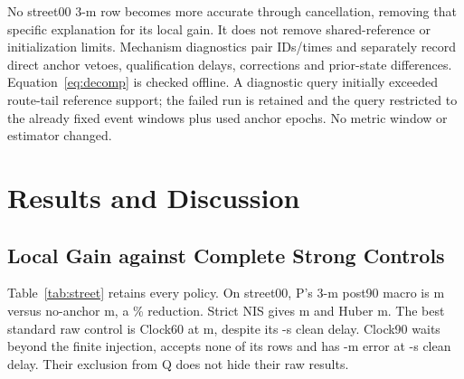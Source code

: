 \documentclass[conference]{IEEEtran}
\begin{document}
No street00 3-m row becomes more accurate through cancellation, removing that specific explanation for its local gain. It does not remove shared-reference or initialization limits. Mechanism diagnostics pair IDs/times and separately record direct anchor vetoes, qualification delays, corrections and prior-state differences. Equation~\eqref{eq:decomp} is checked offline. A diagnostic query initially exceeded route-tail reference support; the failed run is retained and the query restricted to the already fixed event windows plus used anchor epochs. No metric window or estimator changed.

\begin{table}[t]
\caption{Six routes, all already seen in this post-hoc analysis. 3-m post90 event-macro errors (m); P natural RMSE / inherited cap (m); maximum actual clean delay $T_c$ (s). Lower raw controls remain visible even outside Q.}\label{tab:routes}
\centering\small\setlength{\tabcolsep}{5pt}

\end{table}

\section{Results and Discussion}
\subsection{Local Gain against Complete Strong Controls}
Table~\ref{tab:street} retains every policy. On street00, P's 3-m post90 macro is  m versus no-anchor  m, a \% reduction. Strict NIS gives  m and Huber  m. The best standard raw control is Clock60 at  m, despite its -s clean delay. Clock90 waits beyond the finite injection, accepts none of its rows and has -m error at -s clean delay. Their exclusion from Q does not hide their raw results.

\begin{table}[t]
\caption{street00 controlled 3-m results, all 19 fixed policies. $R_{90}/R_{180}$: event-macro horizontal RMSE (m). $T_c$: maximum actual clean admission (s); C180 is censored. $n_b$: accepted injected rows out of 270. Q combines natural cost, clean service and coverage.}\label{tab:street}
\centering\small\setlength{\tabcolsep}{3pt}

\end{table}
\end{document}
